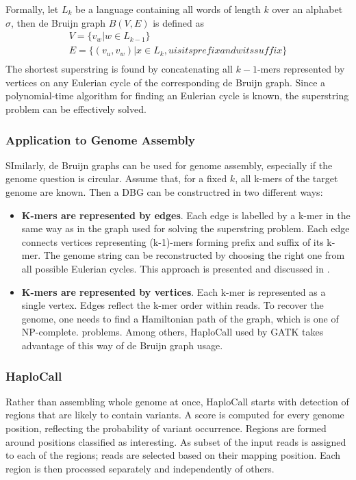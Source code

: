 Formally, let $L_k$ be a language containing all words of length $k$ over an alphabet $\sigma$, then de Bruijn graph $B(V, E)$ is defined as
\begin{gather}
V = \{v_w | w \in L_{k-1}\} \\
E = \{(v_u, v_w) | x \in L_k,  u is its prefix and w its suffix \} \\
\end{gather}
The shortest superstring is found by concatenating all $k-1$-mers represented by vertices on any Eulerian cycle of the corresponding de Bruijn graph. Since a polynomial-time algorithm for finding an Eulerian cycle is known, the superstring problem can be effectively solved.

\subsubsection{Application to Genome Assembly}
\label{subsub:dbg-application-to-genome-assembly}

SImilarly, de Bruijn graphs can be used for genome assembly, especially if the genome question is circular. Assume that, for a fixed $k$, all k-mers of the target genome are known. Then a DBG can be constructred in two different ways:
\begin{itemize}
\item \textbf{K-mers are represented by edges}. Each edge is labelled by a k-mer in the same way as in the graph used for solving the superstring problem. Each edge connects vertices representing (k-1)-mers forming prefix and suffix of its k-mer. The genome string can be reconstructed by choosing the right one from all possible Eulerian cycles. This approach is presented and discussed in \cite{dbg-apply}.
\item \textbf{K-mers are represented by vertices}. Each k-mer is represented as a single vertex. Edges reflect the k-mer order within reads. To recover the genome, one needs to find a Hamiltonian path of the graph, which is one of NP-complete. problems. Among others, HaploCall \cite{haplocall} used by GATK takes advantage of this way of de Bruijn graph usage.
\end{itemize}

\subsubsection{HaploCall}
\label{subsub:haplocall}

Rather than assembling whole genome at once, HaploCall starts with detection of regions that are likely to contain variants. A score is computed for every genome position, reflecting the probability of variant occurrence. Regions are formed around positions classified as interesting. As subset of the input reads is assigned to each of the regions; reads are selected based on their mapping position. Each region is then processed separately and independently of others.

